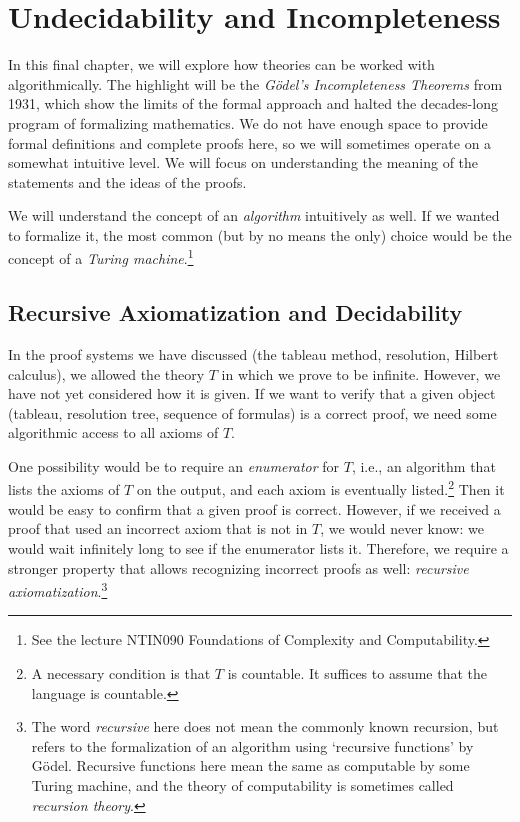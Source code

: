 \chapter{Undecidability and Incompleteness}

In this final chapter, we will explore how theories can be worked with algorithmically. The highlight will be the \emph{Gödel's Incompleteness Theorems} from 1931, which show the limits of the formal approach and halted the decades-long program of formalizing mathematics. We do not have enough space to provide formal definitions and complete proofs here, so we will sometimes operate on a somewhat intuitive level. We will focus on understanding the meaning of the statements and the ideas of the proofs.

We will understand the concept of an \emph{algorithm} intuitively as well. If we wanted to formalize it, the most common (but by no means the only) choice would be the concept of a \emph{Turing machine}.\footnote{See the lecture NTIN090 Foundations of Complexity and Computability.}

\section{Recursive Axiomatization and Decidability}

In the proof systems we have discussed (the tableau method, resolution, Hilbert calculus), we allowed the theory $T$ in which we prove to be infinite. However, we have not yet considered how it is given. If we want to verify that a given object (tableau, resolution tree, sequence of formulas) is a correct proof, we need some algorithmic access to all axioms of $T$.

One possibility would be to require an \emph{enumerator} for $T$, i.e., an algorithm that lists the axioms of $T$ on the output, and each axiom is eventually listed.\footnote{A necessary condition is that $T$ is countable. It suffices to assume that the language is countable.} Then it would be easy to confirm that a given proof is correct. However, if we received a proof that used an incorrect axiom that is not in $T$, we would never know: we would wait infinitely long to see if the enumerator lists it. Therefore, we require a stronger property that allows recognizing incorrect proofs as well: \emph{recursive axiomatization}.\footnote{The word \emph{recursive} here does not mean the commonly known recursion, but refers to the formalization of an algorithm using `recursive functions' by Gödel. Recursive functions here mean the same as computable by some Turing machine, and the theory of computability is sometimes called \emph{recursion theory}.}

